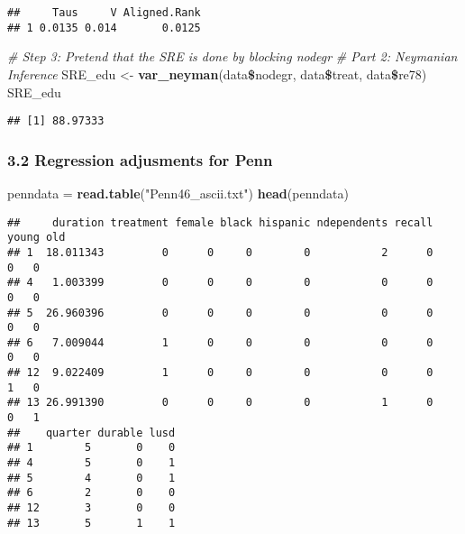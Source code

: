 \documentclass[]{article}
\newenvironment{Shaded}{\begin{snugshade}}{\end{snugshade}}
\newcommand{\KeywordTok}[1]{\textcolor[rgb]{0.13,0.29,0.53}{\textbf{#1}}}
\newcommand{\StringTok}[1]{\textcolor[rgb]{0.31,0.60,0.02}{#1}}
\newcommand{\CommentTok}[1]{\textcolor[rgb]{0.56,0.35,0.01}{\textit{#1}}}
\newcommand{\OperatorTok}[1]{\textcolor[rgb]{0.81,0.36,0.00}{\textbf{#1}}}
\newcommand{\NormalTok}[1]{#1}
\begin{document}
\begin{verbatim}
##     Taus     V Aligned.Rank
## 1 0.0135 0.014       0.0125
\end{verbatim}

\begin{Shaded}
\begin{Highlighting}[]
\CommentTok{# Step 3: Pretend that the SRE is done by blocking nodegr}
\CommentTok{# Part 2: Neymanian Inference}
\NormalTok{SRE_edu <-}\StringTok{ }\KeywordTok{var_neyman}\NormalTok{(data}\OperatorTok{\$}\NormalTok{nodegr, data}\OperatorTok{\$}\NormalTok{treat, data}\OperatorTok{\$}\NormalTok{re78)}
\NormalTok{SRE_edu}
\end{Highlighting}
\end{Shaded}

\begin{verbatim}
## [1] 88.97333
\end{verbatim}

\subsubsection*{3.2 Regression adjusments for Penn}

\begin{Shaded}
\begin{Highlighting}[]
\NormalTok{penndata =}\StringTok{ }\KeywordTok{read.table}\NormalTok{(}\StringTok{"Penn46_ascii.txt"}\NormalTok{)}
\KeywordTok{head}\NormalTok{(penndata)}
\end{Highlighting}
\end{Shaded}

\begin{verbatim}
##     duration treatment female black hispanic ndependents recall young old
## 1  18.011343         0      0     0        0           2      0     0   0
## 4   1.003399         0      0     0        0           0      0     0   0
## 5  26.960396         0      0     0        0           0      0     0   0
## 6   7.009044         1      0     0        0           0      0     0   0
## 12  9.022409         1      0     0        0           0      0     1   0
## 13 26.991390         0      0     0        0           1      0     0   1
##    quarter durable lusd
## 1        5       0    0
## 4        5       0    1
## 5        4       0    1
## 6        2       0    0
## 12       3       0    0
## 13       5       1    1
\end{verbatim}
\end{document}
